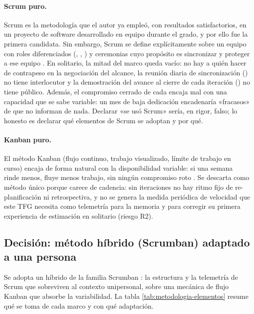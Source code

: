 \paragraph{Scrum puro.}
Scrum es la metodología que el autor ya empleó, con resultados satisfactorios, en un proyecto de software desarrollado en equipo durante el grado, y por ello fue la primera candidata.
Sin embargo, Scrum se define explícitamente sobre un equipo con roles diferenciados (, , ) y ceremonias cuyo propósito es sincronizar y proteger a ese equipo \parencite{scrum-guide}.
En solitario, la mitad del marco queda vacío: no hay a quién hacer de contrapeso en la negociación del alcance, la reunión diaria de sincronización () no tiene interlocutor y la demostración del avance al cierre de cada iteración () no tiene público.
Además, el compromiso cerrado de cada  encaja mal con una capacidad que se sabe variable: un mes de baja dedicación encadenaría «fracasos» de  que no informan de nada.
Declarar «se usó Scrum» sería, en rigor, falso; lo honesto es declarar qué elementos de Scrum se adoptan y por qué.

\paragraph{Kanban puro.}
El método Kanban (flujo continuo, trabajo visualizado, límite de trabajo en curso) encaja de forma natural con la disponibilidad variable: si una semana rinde menos, fluye menos trabajo, sin ningún compromiso roto \parencite{anderson-kanban}.
Se descarta como método único porque carece de cadencia: sin iteraciones no hay ritmo fijo de re-planificación ni retrospectiva, y no se genera la medida periódica de velocidad que este \ac{TFG} necesita como telemetría para la memoria y para corregir su primera experiencia de estimación en solitario (riesgo R2).

\subsection{Decisión: método híbrido (Scrumban) adaptado a una persona}
\label{sec:metodologia-decision}

Se adopta un híbrido de la familia Scrumban \parencite{ladas-scrumban, kniberg-scrumban}: la estructura y la telemetría de Scrum que sobreviven al contexto unipersonal, sobre una mecánica de flujo Kanban que absorbe la variabilidad.
La tabla \ref{tab:metodologia-elementos} resume qué se toma de cada marco y con qué adaptación.

